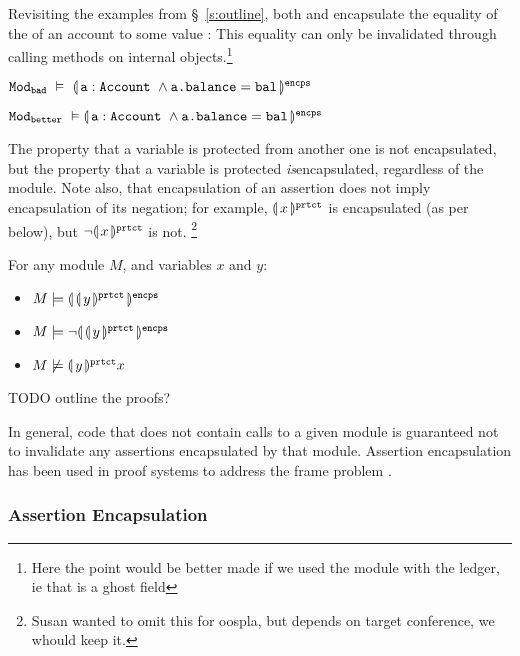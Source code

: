 Revisiting the examples from \S~\ref{s:outline}, %
both \ModB and \ModC encapsulate   the  {equality of the  of an account to some value : }
 {This equality can only be invalidated} through calling  methods on internal objects.\footnote{Here 
 the point would be better made if we used the module with the ledger, ie that  is a ghost field}
%
\\
\strut \hspace{1cm}
${\texttt{Mod}}_{{\texttt{bad}}}\ \vDash\ \llparenthesis\,  {\texttt{a}}:{\texttt{Account}}\ \wedge {\texttt{a.balance}}={\texttt{bal}}\, \rrparenthesis^{\texttt{encps}}$
\\
\strut \hspace{1cm}
${\texttt{Mod}}_{{\texttt{better}}}\ \vDash\llparenthesis\,  {\texttt{a}}:{\texttt{Account}}\ \wedge {\texttt{a.balance}}={\texttt{bal}}\, \rrparenthesis^{\texttt{encps}}$


The property that a variable is protected from another one is not encapsulated, but  the property that a variable is protected \emph{is}encapsulated, regardless of the module. Note also, that  encapsulation of an assertion does not imply encapsulation of its negation; 
 for example,  ${\llparenthesis \, x\, \rrparenthesis^{{\texttt{prtct}}}}$ is encapsulated (as per below), but $\neg  {\ensuremath{\llparenthesis \, x\, \rrparenthesis^{{\texttt{prtct}}}}}$ is not. \footnote{Susan wanted to omit this for oospla, but depends on target conference, we whould keep it.}



\begin{lemma}
For any module $M$, and variables $x$ and $y$:
\begin{itemize}
\item $M \models \llparenthesis\, \llparenthesis \, y\, \rrparenthesis^{{\texttt{prtct}}}\, \rrparenthesis^{\texttt{encps}}$
\item $M \models \neg{\ensuremath \llparenthesis\, \ensuremath{\llparenthesis \, y\, \rrparenthesis^{{\texttt{prtct}}}}\, \rrparenthesis^{\texttt{encps}}}$
\item $M \not\models \llparenthesis \, y\, \rrparenthesis^{{\texttt{prtct}}} x$
\end{itemize}
\end{lemma}

TODO outline the proofs? 
\noindent 


{In general},  code that does not contain 
calls to a {given} module is guaranteed not to invalidate any assertions encapsulated by that module.
 Assertion encapsulation has been used in proof systems to {address}   the  {frame} problem
 \cite{objInvars,encaps}. 

\subsubsection{ Assertion Encapsulation}

